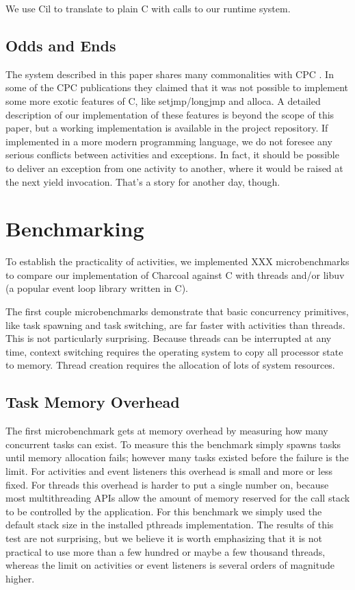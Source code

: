 \documentclass[10pt,preprint]{sigplanconf}
\begin{document}
We use Cil \cite{Necula2002} to translate \charcoal{} to plain C with calls to our runtime system.

\subsection{Odds and Ends}

The system described in this paper shares many commonalities with CPC \cite{Kerneis2013}.
In some of the CPC publications they claimed that it was not possible to implement some more exotic features of C, like setjmp/longjmp and alloca.
A detailed description of our implementation of these features is beyond the scope of this paper, but a working implementation is available in the project repository.
If implemented in a more modern programming language, we do not foresee any serious conflicts between activities and exceptions.
In fact, it should be possible to deliver an exception from one activity to another, where it would be raised at the next yield invocation.
That's a story for another day, though.

\section{Benchmarking}

To establish the practicality of activities, we implemented XXX microbenchmarks to compare our implementation of Charcoal against C with threads and/or libuv (a popular event loop library written in C).

The first couple microbenchmarks demonstrate that basic concurrency primitives, like task spawning and task switching, are far faster with activities than threads.
This is not particularly surprising.
Because threads can be interrupted at any time, context switching requires the operating system to copy all processor state to memory.
Thread creation requires the allocation of lots of system resources.

\subsection{Task Memory Overhead}

The first microbenchmark gets at memory overhead by measuring how many concurrent tasks can exist.
To measure this the benchmark simply spawns tasks until memory allocation fails; however many tasks existed before the failure is the limit.
For activities and event listeners this overhead is small and more or less fixed.
For threads this overhead is harder to put a single number on, because most multithreading APIs allow the amount of memory reserved for the call stack to be controlled by the application.
For this benchmark we simply used the default stack size in the installed pthreads implementation.
The results of this test are not surprising, but we believe it is worth emphasizing that it is not practical to use more than a few hundred or maybe a few thousand threads, whereas the limit on activities or event listeners is several orders of magnitude higher.
\end{document}
